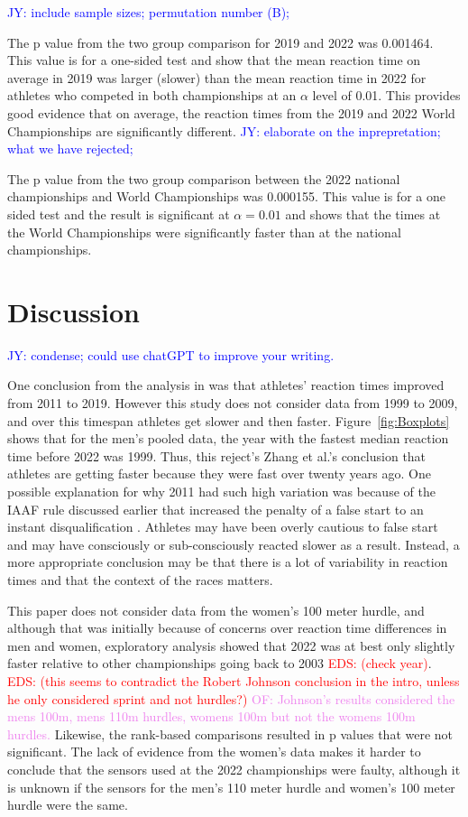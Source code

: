 \documentclass[12pt, letterpaper, titlepage]{article}
\newcommand{\jy}[1]{\textcolor{blue}{JY: #1}}
\newcommand{\eds}[1]{\textcolor{red}{EDS: (#1)}}
\newcommand{\of}[1]{\textcolor{violet}{OF: #1}}
\begin{document}
\jy{include sample sizes; permutation number (B);}

The p value from the two group comparison for 2019 and 2022 was 0.001464.  This 
value is for a one-sided test and show that the mean reaction time on average in
2019 was larger (slower) than the mean reaction time in 2022 for athletes who 
competed in both championships at an $\alpha$ level of 0.01. This provides good
evidence that on average, the reaction times from the 2019 and 2022 World 
Championships are significantly different.  
\jy{elaborate on the inprepretation; what we have rejected;}


The p value from the two group comparison between the 2022 national
championships and World Championships was 0.000155. This value is for a one sided
test and the result is significant at $\alpha = 0.01$ and shows that
the times at the World Championships were significantly faster than at the
national championships.




\section{Discussion}\label{sec:Discussion}

\jy{condense; could use chatGPT to improve your writing.}

One conclusion from the analysis in \citet{zhang2021correlation} was that 
athletes' reaction times improved from 2011 to 2019.  However this study does 
not consider data from 1999 to 2009, and over this timespan athletes get slower 
and then faster.  Figure~\ref{fig:Boxplots} shows that for the men's pooled data,
the year with the fastest median reaction time before 2022 was 1999.  Thus, this 
reject's Zhang et al.'s conclusion that athletes are getting faster because they 
were fast over twenty years ago. One possible explanation for why 2011 had such
high variation was because of the IAAF rule discussed earlier that increased the
penalty of a false start to an instant disqualification \citep{iaaf2009falsestart}.
Athletes may have been overly cautious to false start and may have consciously
or sub-consciously reacted slower as a result.  Instead, a more appropriate 
conclusion may be that there is a lot of variability in reaction times and that
the context of the races matters.


This paper does not consider data from the women's 100 meter hurdle, and although
that was initially because of concerns over reaction time differences in men and
women, exploratory analysis showed that 2022 was at best only
slightly faster relative to other championships going back to 2003 
\eds{check year}. \eds{this seems to contradict the Robert Johnson conclusion in 
the intro, unless he only considered sprint and not hurdles?} \of{Johnson's
results considered the mens 100m, mens 110m hurdles, womens 100m but not the 
womens 100m hurdles.} Likewise, the rank-based comparisons resulted in p values
that were not significant.  The lack of evidence from the women's data makes it 
harder to conclude that the sensors used at the 2022 championships were faulty, 
although it is unknown if the sensors for the men's 110 meter hurdle and women's
100 meter hurdle were the same.
\end{document}
